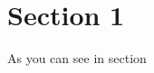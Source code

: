 \documentclass{scrreprt}
\begin{document}
\section[Name of the section to be used by
the reference]{Section 1}\label{sec:Section1}

As you can see in section \textsf{}
\end{document}
